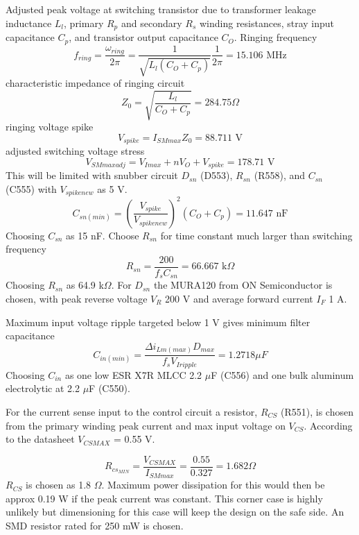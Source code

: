 Adjusted peak voltage at switching transistor due to transformer leakage
inductance $L_l$, primary $R_p$ and secondary $R_s$ winding
resistances, stray input capacitance $C_p$, and transistor output
capacitance $C_O$. Ringing frequency
\begin{equation}
f_{ring}=\frac{\omega_{ring}}{2\pi}=\frac{1}{\sqrt{L_l(C_O+C_p)}}
\frac{1}{2\pi}=15.106 \text{ MHz}
\end{equation}
characteristic impedance of ringing circuit
\begin{equation}
Z_0=\sqrt{\frac{L_l}{C_O+C_p}}=284.75 \Omega
\end{equation}
ringing voltage spike
\begin{equation}
V_{spike}=I_{SMmax}Z_0=88.711 \text{ V}
\end{equation}
adjusted switching voltage stress
\begin{equation}
V_{SMmax adj}=V_{Imax}+nV_O+V_{spike}=178.71 \text{ V}
\end{equation}
This will be limited with snubber circuit $D_{sn}$ (D553), $R_{sn}$
(R558), and $C_{sn}$ (C555) with $V_{spike new}$ as 5 V.
\begin{equation}
C_{sn(min)}=(\frac{V_{spike}}{V_{spike
new}})^2(C_O+C_p)=11.647 \text{ nF}
\end{equation}
Choosing $C_{sn}$ as 15 nF. Choose $R_{sn}$ for time constant much
larger than switching frequency
\begin{equation}
R_{sn}=\frac{200}{f_s C_{sn}}=66.667 \text{ k$\Omega$}
\end{equation}
Choosing $R_{sn}$ as 64.9 k$\Omega$.
For $D_{sn}$ the MURA120 from ON Semiconductor is chosen, with peak
reverse voltage $V_R$ 200 V and average forward current $I_F$ 1 A.

Maximum input voltage ripple targeted below 1 V gives minimum filter
capacitance
\begin{equation}
C_{in(min)}=\frac{\Delta i_{Lm(max)}D_{max}}{f_s V_{Iripple}}=
1.2718 \mu F
\end{equation}
Choosing $C_{in}$ as one low ESR X7R MLCC 2.2 $\mu$F (C556) and one bulk aluminum
electrolytic at 2.2 $\mu$F (C550).


For the current sense input to the control circuit a resistor,
$R_{CS}$ (R551), is chosen from the primary winding peak current and
max input voltage on $V_{CS}$. According to the datasheet $V_{CSMAX}$
= 0.55 V.

\begin{equation}
R_{cs_{MIN}} = \frac{V_{CSMAX}}{I_{SMmax}} = \frac{0.55}{0.327} =
1.682 \text{$\Omega$}
\end{equation}
$R_{CS}$ is chosen as 1.8 $\Omega$. Maximum power dissipation for this
would then be approx 0.19 W if the peak current was constant. This
corner case is highly unlikely but dimensioning for this case will
keep the design on the safe side. An SMD resistor rated for 250 mW is
chosen.


